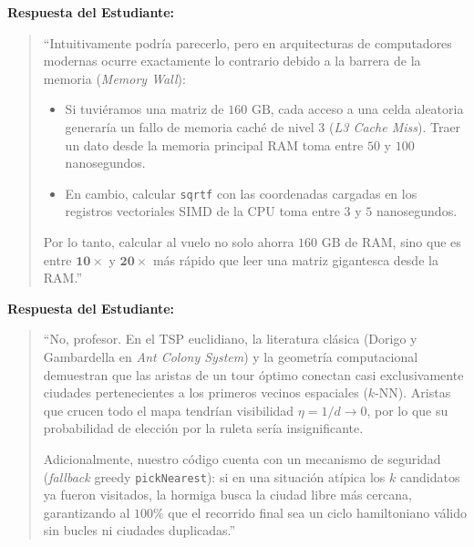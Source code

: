 \documentclass[11pt,a4paper]{article}
\begin{document}
\begin{sustentacionbox}
\textbf{Respuesta del Estudiante:}
\begin{quote}
``Intuitivamente podría parecerlo, pero en arquitecturas de computadores modernas ocurre exactamente lo contrario debido a la barrera de la memoria (\emph{Memory Wall}):
\begin{itemize}
    \item Si tuviéramos una matriz de $160\text{ GB}$, cada acceso a una celda aleatoria generaría un fallo de memoria caché de nivel 3 (\emph{L3 Cache Miss}). Traer un dato desde la memoria principal RAM toma entre $50$ y $100$ nanosegundos.
    \item En cambio, calcular \texttt{sqrtf} con las coordenadas cargadas en los registros vectoriales SIMD de la CPU toma entre $3$ y $5$ nanosegundos.
\end{itemize}
Por lo tanto, calcular al vuelo no solo ahorra $160\text{ GB}$ de RAM, sino que es entre $\mathbf{10\times}$ y $\mathbf{20\times}$ más rápido que leer una matriz gigantesca desde la RAM.''
\end{quote}
\end{sustentacionbox}

\begin{sustentacionbox}[Pregunta 3 del Profesor: ¿Reducir la feromona a $k=8$ vecinos no perjudica la convergencia global del ACO?]
\textbf{Respuesta del Estudiante:}
\begin{quote}
``No, profesor. En el TSP euclidiano, la literatura clásica (Dorigo y Gambardella en \emph{Ant Colony System}) y la geometría computacional demuestran que las aristas de un tour óptimo conectan casi exclusivamente ciudades pertenecientes a los primeros vecinos espaciales ($k$-NN). Aristas que crucen todo el mapa tendrían visibilidad $\eta = 1/d \to 0$, por lo que su probabilidad de elección por la ruleta sería insignificante.

Adicionalmente, nuestro código cuenta con un mecanismo de seguridad (\emph{fallback} greedy \texttt{pickNearest}): si en una situación atípica los $k$ candidatos ya fueron visitados, la hormiga busca la ciudad libre más cercana, garantizando al $100\%$ que el recorrido final sea un ciclo hamiltoniano válido sin bucles ni ciudades duplicadas.''
\end{quote}
\end{sustentacionbox}
\end{document}
